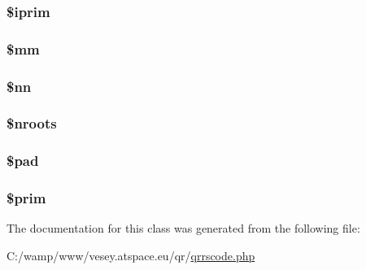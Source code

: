 \hypertarget{class_q_rrs_item_a172d75cf5939fd6b6dce66823467e8b3}{
\subsubsection[{\$iprim}]{\setlength{\rightskip}{0pt plus 5cm}\$iprim}}\label{class_q_rrs_item_a172d75cf5939fd6b6dce66823467e8b3}
\hypertarget{class_q_rrs_item_ae0e5a80c09d9f85b792c6972f3b86316}{
\subsubsection[{\$mm}]{\setlength{\rightskip}{0pt plus 5cm}\$mm}}\label{class_q_rrs_item_ae0e5a80c09d9f85b792c6972f3b86316}
\hypertarget{class_q_rrs_item_a14ed3575297e17e63b8dc152617588ca}{
\subsubsection[{\$nn}]{\setlength{\rightskip}{0pt plus 5cm}\$nn}}\label{class_q_rrs_item_a14ed3575297e17e63b8dc152617588ca}
\hypertarget{class_q_rrs_item_a6442f3697f06124c64aaafe093d22e08}{
\subsubsection[{\$nroots}]{\setlength{\rightskip}{0pt plus 5cm}\$nroots}}\label{class_q_rrs_item_a6442f3697f06124c64aaafe093d22e08}
\hypertarget{class_q_rrs_item_a25f844f88387656d00fcdd1e816061da}{
\subsubsection[{\$pad}]{\setlength{\rightskip}{0pt plus 5cm}\$pad}}\label{class_q_rrs_item_a25f844f88387656d00fcdd1e816061da}
\hypertarget{class_q_rrs_item_a19a932771222bd824b3fb9789a7bb336}{
\subsubsection[{\$prim}]{\setlength{\rightskip}{0pt plus 5cm}\$prim}}\label{class_q_rrs_item_a19a932771222bd824b3fb9789a7bb336}


The documentation for this class was generated from the following file\-:\begin{DoxyCompactItemize}
\item 
C\-:/wamp/www/vesey.\-atspace.\-eu/qr/\hyperlink{qrrscode_8php}{qrrscode.\-php}\end{DoxyCompactItemize}
